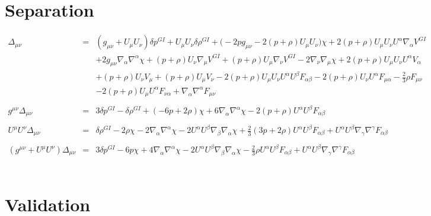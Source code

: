 \documentclass[10pt,letterpaper]{article}
\numberwithin{equation}{section}
\begin{document}
\section{Separation}
%
%
\begin{eqnarray}
\Delta_{\mu\nu}&=& (g_{\mu \nu } + U_{\mu } U_{\nu }) \delta p^{GI}{} + U_{\mu } U_{\nu } \delta \rho^{GI}{} + \bigl(-2 p g_{\mu \nu } - 2 (p + \rho) U_{\mu } U_{\nu }\bigr) \chi + 2 (p + \rho) U_{\mu } U_{\nu } U^{\alpha } \nabla_{\alpha }V^{GI}{} \nonumber \\ 
&& + 2 g_{\mu \nu } \nabla_{\alpha }\nabla^{\alpha }\chi + (p + \rho) U_{\nu } \nabla_{\mu }V^{GI}{} + (p + \rho) U_{\mu } \nabla_{\nu }V^{GI}{} - 2 \nabla_{\nu }\nabla_{\mu }\chi +2 (p + \rho) U_{\mu } U_{\nu } U^{\alpha } V_{\alpha } \nonumber \\ 
&& + (p + \rho) U_{\nu } V_{\mu } + (p + \rho) U_{\mu } V_{\nu }-2 (p + \rho) U_{\mu } U_{\nu } U^{\alpha } U^{\beta } F_{\alpha \beta } - 2 (p + \rho) U_{\nu } U^{\alpha } F_{\mu \alpha } -  \tfrac{2}{3} \rho F_{\mu \nu } \nonumber \\ 
&& - 2 (p + \rho) U_{\mu } U^{\alpha } F_{\nu \alpha } + \nabla_{\alpha }\nabla^{\alpha }F_{\mu \nu }
\\  \nonumber\\ 
g^{\mu\nu}\Delta_{\mu\nu}&=& 3 \delta p^{GI}{} -  \delta \rho^{GI}{} + (-6 p + 2 \rho) \chi + 6 \nabla_{\alpha }\nabla^{\alpha }\chi -2 (p + \rho) U^{\alpha } U^{\beta } F_{\alpha \beta }
\\ \nonumber\\
U^\mu U^\nu \Delta_{\mu\nu}&=& \delta \rho^{GI}{} - 2 \rho \chi - 2 \nabla_{\alpha }\nabla^{\alpha }\chi - 2 U^{\alpha } U^{\beta } \nabla_{\beta }\nabla_{\alpha }\chi +\tfrac{2}{3} (3 p + 2 \rho) U^{\alpha } U^{\beta } F_{\alpha \beta } + U^{\alpha } U^{\beta } \nabla_{\gamma }\nabla^{\gamma }F_{\alpha \beta }
\\  \nonumber\\ 
(g^{\mu\nu}+U^\mu U^\nu)\Delta_{\mu\nu}&=& 3 \delta p^{GI}{} - 6 p \chi + 4 \nabla_{\alpha }\nabla^{\alpha }\chi - 2 U^{\alpha } U^{\beta } \nabla_{\beta }\nabla_{\alpha }\chi - \tfrac{2}{3} \rho U^{\alpha } U^{\beta } F_{\alpha \beta } + U^{\alpha } U^{\beta } \nabla_{\gamma }\nabla^{\gamma }F_{\alpha \beta }
\end{eqnarray}
%
%
\\
\section{Validation}
%
\end{document}
